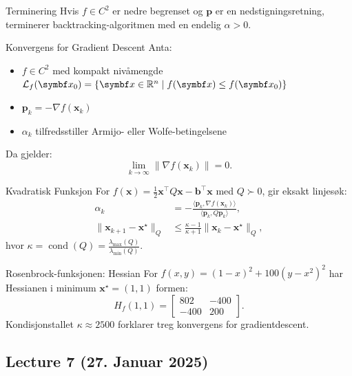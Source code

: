 \begin{lemma}{Terminering}{}
  Hvis \( f \in C^2 \) er nedre begrenset og \( \bm{p} \) er en nedstigningsretning, terminerer backtracking-algoritmen med en endelig \( \alpha > 0 \).
\end{lemma}

\begin{theorem}{Konvergens for Gradient Descent}{}
  Anta:
  \begin{itemize}
    \item \( f \in C^2 \) med kompakt nivåmengde \( \mathcal{L}_f(\bm{x}_0) = \{\bm{x} \in \R^n \mid f(\bm{x}) \leq f(\bm{x}_0)\} \)
    \item \( \bm{p}_k = -\nabla f(\bm{x}_k) \)
    \item \( \alpha_k \) tilfredsstiller Armijo- eller Wolfe-betingelsene
  \end{itemize}
  Da gjelder:
  \[
    \lim_{k \to \infty} \|\nabla f(\bm{x}_k)\| = 0.
  \]
\end{theorem}

\begin{example}{Kvadratisk Funksjon}{}
  For \( f(\bm{x}) = \frac{1}{2} \bm{x}^\top Q \bm{x} - \bm{b}^\top \bm{x} \) med \( Q \succ 0 \), gir eksakt linjesøk:
  \begin{align*}
    \alpha_k                          & = -\frac{\langle \bm{p}_k, \nabla f(\bm{x}_k) \rangle}{\langle \bm{p}_k, Q \bm{p}_k \rangle}, \\
    \|\bm{x}_{k+1} - \bm{x}^\star\|_Q & \leq \frac{\kappa - 1}{\kappa + 1} \|\bm{x}_k - \bm{x}^\star\|_Q,
  \end{align*}
  hvor \( \kappa = \operatorname{cond}(Q) = \frac{\lambda_{\max}(Q)}{\lambda_{\min}(Q)} \).
\end{example}

\begin{example}{Rosenbrock-funksjonen: Hessian}{}
  For \( f(x,y) = (1 - x)^2 + 100(y - x^2)^2 \) har Hessianen i minimum \( \bm{x}^\star = (1,1) \) formen:
  \[
    H_f(1,1) = \begin{bmatrix} 802 & -400 \\ -400 & 200 \end{bmatrix}.
  \]
  Kondisjonstallet \( \kappa \approx 2500 \) forklarer treg konvergens for gradientdescent.
\end{example}


\subsection{Lecture 7 (27. Januar 2025)}

